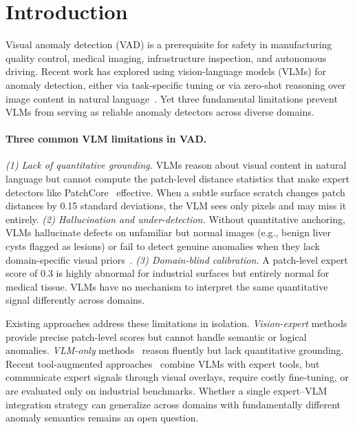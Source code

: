 \section{Introduction}

Visual anomaly detection (VAD) is a prerequisite for safety in manufacturing quality control, medical imaging, infrastructure inspection, and autonomous driving.
Recent work has explored using vision-language models (VLMs) for anomaly detection, either via task-specific tuning or via zero-shot reasoning over image content in natural language~\citep{gu2024anomalygpt,jiang2024mmad,chen2026eagle}.
Yet three fundamental limitations prevent VLMs from serving as reliable anomaly detectors across diverse domains.

\paragraph{Three common VLM limitations in VAD.}
\emph{(1) Lack of quantitative grounding.}
VLMs reason about visual content in natural language but cannot compute the patch-level distance statistics that make expert detectors like PatchCore~\citep{roth2022patchcore} effective.
When a subtle surface scratch changes patch distances by 0.15 standard deviations, the VLM sees only pixels and may miss it entirely.
\emph{(2) Hallucination and under-detection.}
Without quantitative anchoring, VLMs hallucinate defects on unfamiliar but normal images (e.g., benign liver cysts flagged as lesions) or fail to detect genuine anomalies when they lack domain-specific visual priors~\citep{jiang2024mmad}.
\emph{(3) Domain-blind calibration.}
A patch-level expert score of 0.3 is highly abnormal for industrial surfaces but entirely normal for medical tissue.
VLMs have no mechanism to interpret the same quantitative signal differently across domains.

Existing approaches address these limitations in isolation.
\emph{Vision-expert} methods~\citep{roth2022patchcore,oquab2024dinov2,jeong2023winclip} provide precise patch-level scores but cannot handle semantic or logical anomalies.
\emph{VLM-only} methods~\citep{gu2024anomalygpt,jiang2024mmad,cao2025anomalyonevision} reason fluently but lack quantitative grounding.
Recent tool-augmented approaches~\citep{zhang2025agentiad,chen2026eagle,wei2025autoiad} combine VLMs with expert tools, but communicate expert signals through visual overlays, require costly fine-tuning, or are evaluated only on industrial benchmarks.
Whether a single expert--VLM integration strategy can generalize across domains with fundamentally different anomaly semantics remains an open question.

